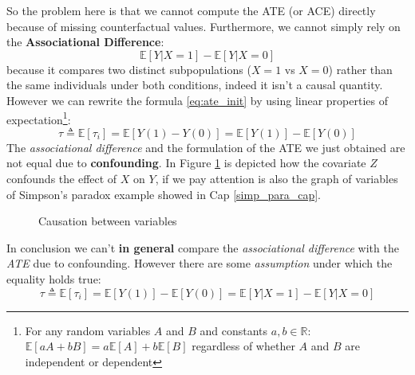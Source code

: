 So the problem here is that we cannot compute the ATE (or ACE) directly because of missing 
counterfactual values.
Furthermore, we cannot simply rely on the \textbf{Associational Difference}:
$$\mathbb{E}[Y \vert{} X = 1] - \mathbb{E}[Y \vert{} X = 0]$$
because it compares two distinct subpopulations ($X=1$ vs $X=0$) rather than the same individuals 
under both conditions, indeed it isn't a causal quantity.
However we can rewrite the formula \ref{eq:ate_init} by using linear properties of expectation\footnote{
For any random variables $A$ and $B$ and constants $a, b \in \mathbb{R}$: $\mathbb{E}[aA + bB] = a\mathbb{E}[A] + b\mathbb{E}[B]$
\noindent
regardless of whether $A$ and $B$ are independent or dependent
}:
\begin{equation}
    \tau \triangleq \mathbb{E}[\tau_i] = \mathbb{E}[Y(1) - Y(0)] = \mathbb{E}[Y(1)] - \mathbb{E}[Y(0)]
\end{equation}
The \textit{associational difference} and the formulation of the ATE we just obtained are not equal
due to \textbf{confounding}. In Figure \ref{fig:confouning_graph} is depicted how the covariate $Z$ confounds
the effect of $X$ on $Y$, if we pay attention is also the graph of variables of Simpson's paradox example showed in Cap \ref{simp_para_cap}.
\begin{figure}[htbp]
    \centering
    \caption{Causation between variables}
    \label{fig:confouning_graph}
\end{figure}
\newline
In conclusion  we can't \textbf{in general} compare the \textit{associational difference} with the \textit{ATE} due to confounding.
However there are some \textit{assumption} under which the equality holds true:
\begin{equation}
    \tau \triangleq \mathbb{E}[\tau_i] = \mathbb{E}[Y(1)] - \mathbb{E}[Y(0)] = \mathbb{E}[Y \vert{} X = 1] - \mathbb{E}[Y \vert{} X = 0]
    \label{eq:asso_equal_ate}
\end{equation}

